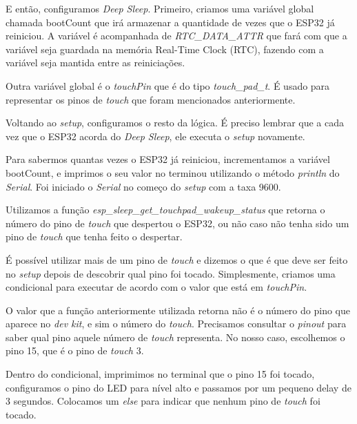 \documentclass[12pt]{article}
\begin{document}


E então, configuramos \textit{Deep Sleep}. Primeiro, criamos uma variável global chamada bootCount que irá armazenar a quantidade de vezes que o ESP32 já reiniciou. A variável é acompanhada de \textit{RTC\_DATA\_ATTR} que fará com que a variável seja guardada na memória Real-Time Clock (RTC), fazendo com a variável seja mantida entre as reiniciações.

Outra variável global é o \textit{touchPin} que é do tipo \textit{touch\_pad\_t}. É usado para representar os pinos de \textit{touch} que foram mencionados anteriormente.



Voltando ao \textit{setup}, configuramos o resto da lógica. É preciso lembrar que a cada vez que o ESP32 acorda do \textit{Deep Sleep}, ele executa o \textit{setup} novamente.

Para sabermos quantas vezes o ESP32 já reiniciou, incrementamos a variável bootCount, e imprimos o seu valor no terminou utilizando o método \textit{println} do \textit{Serial}. Foi iniciado o \textit{Serial} no começo do \textit{setup} com a taxa 9600.



Utilizamos a função \textit{esp\_sleep\_get\_touchpad\_wakeup\_status} que retorna o número do pino de \textit{touch} que despertou o ESP32, ou não caso não tenha sido um pino de \textit{touch} que tenha feito o despertar.



É possível utilizar mais de um pino de \textit{touch} e dizemos o que é que deve ser feito no \textit{setup} depois de descobrir qual pino foi tocado. Simplesmente, criamos uma condicional para executar de acordo com o valor que está em \textit{touchPin}. 

O valor que a função anteriormente utilizada retorna não é o número do pino que aparece no \textit{dev kit}, e sim o número do \textit{touch}. Precisamos consultar o \textit{pinout} para saber qual pino aquele número de \textit{touch} representa. No nosso caso, escolhemos o pino 15, que é o pino de \textit{touch} 3.

Dentro do condicional, imprimimos no terminal que o pino 15 foi tocado, configuramos o pino do LED para nível alto e passamos por um pequeno delay de 3 segundos. Colocamos um \textit{else} para indicar que nenhum pino de \textit{touch} foi tocado.
\end{document}

